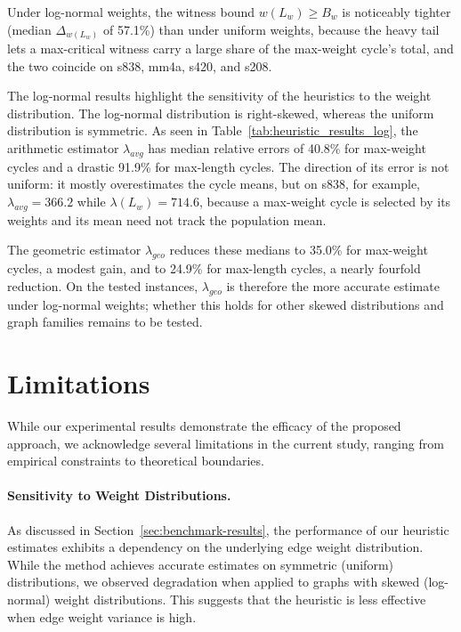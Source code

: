 \documentclass{article}
\theoremstyle{definition}
\begin{document}
Under log-normal weights, the witness bound $w(L_w) \geq B_w$ is
noticeably tighter (median $\Delta_{w(L_w)}$ of 57.1\%) than under
uniform weights, because the heavy tail lets a max-critical witness
carry a large share of the max-weight cycle's total, and the two
coincide on s838, mm4a, s420, and s208.

The log-normal results highlight the sensitivity of the heuristics
to the weight distribution. The log-normal distribution is
right-skewed, whereas the uniform distribution is symmetric. As seen in
Table~\ref{tab:heuristic_results_log}, the arithmetic estimator
$\lambda_{avg}$ has median relative errors of 40.8\% for max-weight
cycles and a drastic 91.9\% for max-length cycles. The direction of
its error is not uniform: it mostly overestimates the cycle means, but
on s838, for example, $\lambda_{avg} = 366.2$ while $\lambda(L_w) =
714.6$, because a max-weight cycle is selected by its weights and its
mean need not track the population mean.

The geometric estimator $\lambda_{geo}$ reduces these medians to
35.0\% for max-weight cycles, a modest gain, and to 24.9\% for
max-length cycles, a nearly fourfold reduction. On the tested
instances, $\lambda_{geo}$ is therefore the more accurate estimate
under log-normal weights; whether this holds for other skewed
distributions and graph families remains to be tested.

\section{Limitations}
\label{sec:limits}

While our experimental results demonstrate the efficacy of the
proposed approach, we acknowledge several limitations in the current
study, ranging from empirical constraints to theoretical boundaries.

\paragraph{Sensitivity to Weight Distributions.}
As discussed in Section~\ref{sec:benchmark-results}, the performance
of our heuristic estimates exhibits a dependency on the underlying
edge weight distribution. While the method achieves accurate estimates
on symmetric (uniform) distributions, we observed degradation when
applied to graphs with skewed (log-normal) weight distributions. This
suggests that the heuristic is less effective when edge weight
variance is high.
\end{document}

